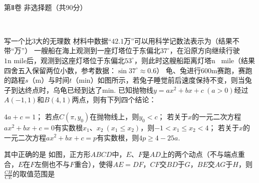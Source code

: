 \documentclass[10pt]{article}
\begin{document}
\par \ \par \centerline{\large \heiti 第Ⅱ卷 \quad 非选择题（共90分）} \par \ \par

\begin{questions}{\complitingintroduction}
    \question 写一个比$3$大的无理数\complitingline
    材料中数据``$42.1$万''可以用科学记数法表示为\complitingline （结果不带``万''）
    \question 一艘船在海上观测到一座灯塔位于东偏北$37^{\circ}$，在沿原方向继续行驶$1\text{n \ mile}$后，观测到这座灯塔位于东偏北$53^{\circ}$，则此时这艘船距离灯塔\complitingline n \ mile（结果四舍五入保留两位小数，参考数据：$\sin 37^{\circ} \approx 0.6$）
    \question 龟、兔进行$600$m赛跑，赛跑的路程$s$（m）与时间$t$（min）如图所示，若兔子睡觉前后速度保持不变，则当兔子到达终点时，乌龟已经到达了\complitingline min.
    \question 已知抛物线$y=ax^2+bx+c \ (a > 0)$经过$A(-1,1)$和$B(4,1)$两点，则有下列四个结论：
    \begin{subsubquestions}
        \subsubquestion $4a+c=1$；
        \subsubquestion 若点$C(\pi,y_0)$在抛物线上，则$y_0 < c$；
        \subsubquestion 若关于$x$的一元二次方程$ax^2+bx+c=0$有实数根$x_1$、$x_2 \ (x_1 \leq x_2)$，则$-1 < x_1 \leq x_2 < 4$；
        \subsubquestion 若关于$x$的一元二次方程$ax^2+bx+c=p$有实数根，则$4p \geq 4-25a$.
    \end{subsubquestions}
    其中正确的是\complitingline
    \question 如图，正方形$ABCD$中，$E$、$F$是$AD$上的两个动点（不与端点重合，$E$在$F$左侧也不与$F$重合），使得$AE=DF$，$CF$交$BD$于$G$，$BE$交$AG$于$H$，则$\frac{CH}{CE}$的取值范围是\complitingline
    \begin{figure}[!htb]
        \centering
\end{figure}
\end{questions}
\end{document}
